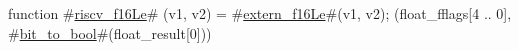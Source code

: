 function #\hyperref[sailRISCVzriscvzyf16Le]{riscv\_f16Le}# (v1, v2) = {
  #\hyperref[sailRISCVzexternzyf16Le]{extern\_f16Le}#(v1, v2);
  (float_fflags[4 .. 0], #\hyperref[sailRISCVzbitzytozybool]{bit\_to\_bool}#(float_result[0]))
}
